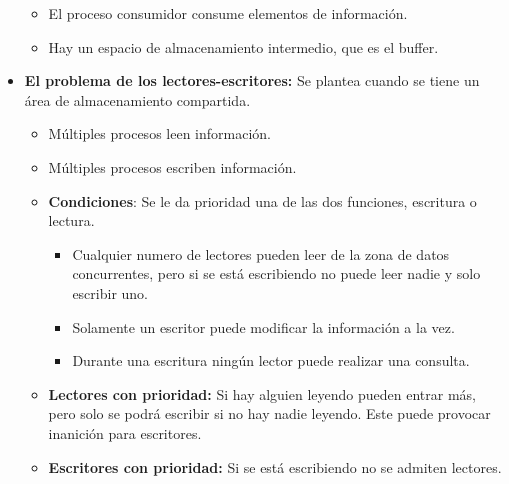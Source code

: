 \documentclass[12pt, twoside, openright]{report} %
\begin{document}
\begin{itemize}
\begin{itemize}
    \item El proceso consumidor consume elementos de información.
      
    \item Hay un espacio de almacenamiento intermedio, que es el buffer.
      
    \end{itemize}
	\pagebreak
  \item \textbf{El problema de los lectores-escritores:} Se plantea cuando
    se tiene un área de almacenamiento compartida.
    

    \begin{itemize}
    \item Múltiples procesos leen información.
      
    \item Múltiples procesos escriben información.
      
    \end{itemize}

    \begin{itemize}
    \item \textbf{Condiciones}: Se le da prioridad una de las dos funciones,
      escritura o lectura.
      

      \begin{itemize}
      \item Cualquier numero de lectores pueden leer de la zona de datos
        concurrentes, pero si se está escribiendo no puede leer nadie y
        solo escribir uno.
        
      \item Solamente un escritor puede modificar la información a la vez.
        
      \item Durante una escritura ningún lector puede realizar una consulta.
        
      \end{itemize}
    \item \textbf{Lectores con prioridad:} Si hay alguien leyendo pueden
      entrar más, pero solo se podrá escribir si no hay nadie leyendo.
      Este puede provocar inanición para escritores.
      
    \item \textbf{Escritores con prioridad:} Si se está escribiendo no se
      admiten lectores.
      
    \end{itemize}
  \end{itemize}
\end{document}
